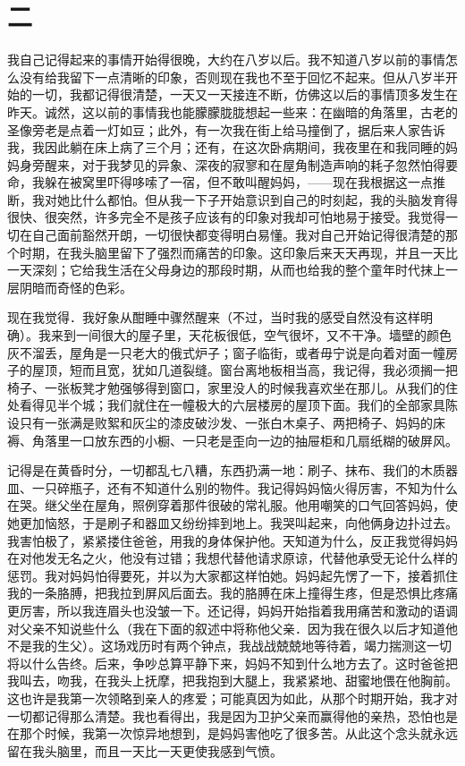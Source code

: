 \documentclass[12pt, UTF8]{ctexbook}
\begin{document}
\newpage
\section*{二}
\par 我自己记得起来的事情开始得很晚，大约在八岁以后。我不知道八岁以前的事情怎么没有给我留下一点清晰的印象，否则现在我也不至于回忆不起来。但从八岁半开始的一切，我都记得很清楚，一天又一天接连不断，仿佛这以后的事情顶多发生在昨天。诚然，这以前的事情我也能朦朦胧胧想起一些来：在幽暗的角落里，古老的圣像旁老是点着一灯如豆；此外，有一次我在街上给马撞倒了，据后来人家告诉我，我因此躺在床上病了三个月；还有，在这次卧病期间，我夜里在和我同睡的妈妈身旁醒来，对于我梦见的异象、深夜的寂寥和在屋角制造声响的耗子忽然怕得要命，我躲在被窝里吓得哆嗦了一宿，但不敢叫醒妈妈，——现在我根据这一点推断，我对她比什么都怕。但从我一下子开始意识到自己的时刻起，我的头脑发育得很快、很突然，许多完全不是孩子应该有的印象对我却可怕地易于接受。我觉得一切在自己面前豁然开朗，一切很快都变得明白易懂。我对自己开始记得很清楚的那个时期，在我头脑里留下了强烈而痛苦的印象。这印象后来天天再现，并且一天比一天深刻；它给我生活在父母身边的那段时期，从而也给我的整个童年时代抹上一层阴暗而奇怪的色彩。
\par 现在我觉得．我好象从酣睡中骤然醒来（不过，当时我的感受自然没有这样明确）。我来到一间很大的屋子里，天花板很低，空气很坏，又不干净。墙壁的颜色灰不溜丢，屋角是一只老大的俄式炉子；窗子临街，或者毋宁说是向着对面一幢房子的屋顶，短而且宽，犹如几道裂缝。窗台离地板相当高，我记得，我必须搁一把椅子、一张板凳才勉强够得到窗口，家里没人的时候我喜欢坐在那儿。从我们的住处看得见半个城；我们就住在一幢极大的六层楼房的屋顶下面。我们的全部家具陈设只有一张满是败絮和灰尘的漆皮破沙发、一张白木桌子、两把椅子、妈妈的床褥、角落里一口放东西的小橱、一只老是歪向一边的抽屉柜和几扇纸糊的破屏风。
\par 记得是在黄昏时分，一切都乱七八糟，东西扔满一地：刷子、抹布、我们的木质器皿、一只碎瓶子，还有不知道什么别的物件。我记得妈妈恼火得厉害，不知为什么在哭。继父坐在屋角，照例穿着那件很破的常礼服。他用嘲笑的口气回答妈妈，使她更加恼怒，于是刷子和器皿又纷纷摔到地上。我哭叫起来，向他俩身边扑过去。我害怕极了，紧紧搂住爸爸，用我的身体保护他。天知道为什么，反正我觉得妈妈在对他发无名之火，他没有过错；我想代替他请求原谅，代替他承受无论什么样的惩罚。我对妈妈怕得要死，并以为大家都这样怕她。妈妈起先愣了一下，接着抓住我的一条胳膊，把我拉到屏风后面去。我的胳膊在床上撞得生疼，但是恐惧比疼痛更厉害，所以我连眉头也没皱一下。还记得，妈妈开始指着我用痛苦和激动的语调对父亲不知说些什么（我在下面的叙述中将称他父亲．因为我在很久以后才知道他不是我的生父）。这场戏历时有两个钟点，我战战兢兢地等待着，竭力揣测这一切将以什么告终。后来，争吵总算平静下来，妈妈不知到什么地方去了。这时爸爸把我叫去，吻我，在我头上抚摩，把我抱到大腿上，我紧紧地、甜蜜地偎在他胸前。这也许是我第一次领略到亲人的疼爱；可能真因为如此，从那个时期开始，我才对一切都记得那么清楚。我也看得出，我是因为卫护父亲而赢得他的亲热，恐怕也是在那个时候，我第一次惊异地想到，是妈妈害他吃了很多苦。从此这个念头就永远留在我头脑里，而且一天比一天更使我感到气愤。
\end{document}
